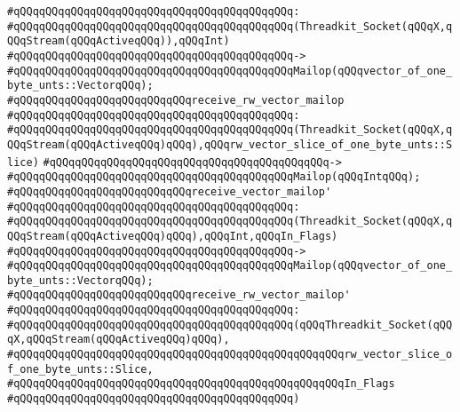 \verb|#qQQqqQQqqQQqqQQqqQQqqQQqqQQqqQQqqQQqqQQqqQQq:|\newline
\verb|#qQQqqQQqqQQqqQQqqQQqqQQqqQQqqQQqqQQqqQQqqQQq(Threadkit_Socket(qQQqX,qQQqStream(qQQqActiveqQQq)),qQQqInt)|\newline
\verb|#qQQqqQQqqQQqqQQqqQQqqQQqqQQqqQQqqQQqqQQqqQQq->|\newline
\verb|#qQQqqQQqqQQqqQQqqQQqqQQqqQQqqQQqqQQqqQQqqQQqMailop(qQQqvector_of_one_byte_unts::VectorqQQq);|\newline
\newline
\verb|#qQQqqQQqqQQqqQQqqQQqqQQqqQQqreceive_rw_vector_mailop|\newline
\verb|#qQQqqQQqqQQqqQQqqQQqqQQqqQQqqQQqqQQqqQQqqQQq:|\newline
\verb|#qQQqqQQqqQQqqQQqqQQqqQQqqQQqqQQqqQQqqQQqqQQq(Threadkit_Socket(qQQqX,qQQqStream(qQQqActiveqQQq)qQQq),qQQqrw_vector_slice_of_one_byte_unts::Slice)|\newline
\verb|#qQQqqQQqqQQqqQQqqQQqqQQqqQQqqQQqqQQqqQQqqQQq->|\newline
\verb|#qQQqqQQqqQQqqQQqqQQqqQQqqQQqqQQqqQQqqQQqqQQqMailop(qQQqIntqQQq);|\newline
\newline
\verb|#qQQqqQQqqQQqqQQqqQQqqQQqqQQqreceive_vector_mailop'|\newline
\verb|#qQQqqQQqqQQqqQQqqQQqqQQqqQQqqQQqqQQqqQQqqQQq:|\newline
\verb|#qQQqqQQqqQQqqQQqqQQqqQQqqQQqqQQqqQQqqQQqqQQq(Threadkit_Socket(qQQqX,qQQqStream(qQQqActiveqQQq)qQQq),qQQqInt,qQQqIn_Flags)|\newline
\verb|#qQQqqQQqqQQqqQQqqQQqqQQqqQQqqQQqqQQqqQQqqQQq->|\newline
\verb|#qQQqqQQqqQQqqQQqqQQqqQQqqQQqqQQqqQQqqQQqqQQqMailop(qQQqvector_of_one_byte_unts::VectorqQQq);|\newline
\newline
\verb|#qQQqqQQqqQQqqQQqqQQqqQQqqQQqreceive_rw_vector_mailop'|\newline
\verb|#qQQqqQQqqQQqqQQqqQQqqQQqqQQqqQQqqQQqqQQqqQQq:|\newline
\verb|#qQQqqQQqqQQqqQQqqQQqqQQqqQQqqQQqqQQqqQQqqQQq(qQQqThreadkit_Socket(qQQqX,qQQqStream(qQQqActiveqQQq)qQQq),|\newline
\verb|#qQQqqQQqqQQqqQQqqQQqqQQqqQQqqQQqqQQqqQQqqQQqqQQqqQQqrw_vector_slice_of_one_byte_unts::Slice,|\newline
\verb|#qQQqqQQqqQQqqQQqqQQqqQQqqQQqqQQqqQQqqQQqqQQqqQQqqQQqIn_Flags|\newline
\verb|#qQQqqQQqqQQqqQQqqQQqqQQqqQQqqQQqqQQqqQQqqQQq)|\newline
